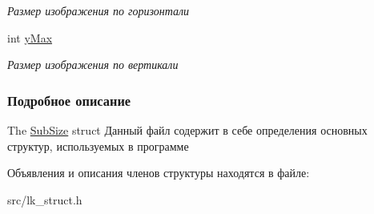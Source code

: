 \begin{DoxyCompactItemize}
\begin{DoxyCompactList}\small\item\em Размер изображения по горизонтали \end{DoxyCompactList}\item 
\hypertarget{structSubSize_a1339f4ef467375f00a073581e350b39d}{}int \hyperlink{structSubSize_a1339f4ef467375f00a073581e350b39d}{y\+Max}\label{structSubSize_a1339f4ef467375f00a073581e350b39d}

\begin{DoxyCompactList}\small\item\em Размер изображения по вертикали \end{DoxyCompactList}\end{DoxyCompactItemize}


\subsubsection{Подробное описание}
The \hyperlink{structSubSize}{Sub\+Size} struct Данный файл содержит в себе определения основных структур, используемых в программе 

Объявления и описания членов структуры находятся в файле\+:\begin{DoxyCompactItemize}
\item 
src/lk\+\_\+struct.\+h\end{DoxyCompactItemize}
